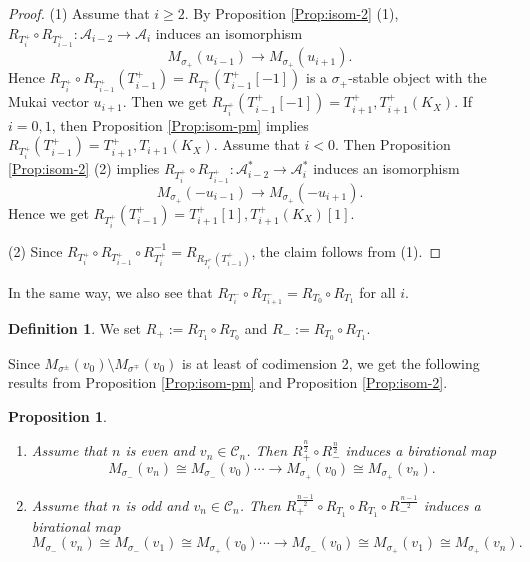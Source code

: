 \documentclass[leqno,11pt]{amsart}
\newtheorem{Prop}[Thm]{Proposition}
\theoremstyle{definition}
\newtheorem{Def}[Thm]{Definition}
\def\AA{\ensuremath{\mathcal A}}
\def\CC{\ensuremath{\mathcal C}}
\begin{document}
\begin{proof}
(1)
Assume that $i \geq 2$.
By Proposition \ref{Prop:isom-2} (1),
$R_{T_{i}^+}\circ R_{T_{i-1}^+}:\AA_{i-2} \to \AA_{i}$
induces an isomorphism
$$
M_{\sigma_+}(u_{i-1}) \to M_{\sigma_+}(u_{i+1}).
$$
Hence $R_{T_{i}^+}\circ R_{T_{i-1}^+}(T_{i-1}^+)
=R_{T_{i}^+}(T_{i-1}^+[-1])$
is a $\sigma_+$-stable object with the Mukai vector $u_{i+1}$.
Then we get 
$R_{T_{i}^+}(T_{i-1}^+[-1])=T_{i+1}^+,T_{i+1}^+(K_X)$.
If $i=0,1$, then Proposition \ref{Prop:isom-pm}
implies $R_{T_i^+}(T_{i-1}^+)=T_{i+1}^+,T_{i+1}(K_X)$.
Assume that $i<0$.
Then Proposition \ref{Prop:isom-2} (2) implies
$R_{T_{i}^+}\circ R_{T_{i-1}^+}:\AA_{i-2}^* \to \AA_{i}^*$
induces an isomorphism
$$
M_{\sigma_+}(-u_{i-1}) \to M_{\sigma_+}(-u_{i+1}).
$$
Hence we get 
$R_{T_{i}^+}(T_{i-1}^+)=T_{i+1}^+[1],T_{i+1}^+(K_X)[1]$.




(2)
Since $R_{T_i^+} \circ R_{T_{i-1}^+} \circ R_{T_i^+}^{-1}=
R_{R_{T_i^+}(T_{i-1}^+)}$, the claim follows from (1).
\end{proof}


In the same way, we also see that
 $R_{T_i^-} \circ R_{T_{i+1}^-} =R_{T_0} \circ R_{T_1}$ for all $i$.

\begin{Def}
We set $R_+:=R_{T_1} \circ R_{T_0}$ and
$R_-:=R_{T_0} \circ R_{T_1}$.
\end{Def}




Since $M_{\sigma^\pm}(v_0) \setminus M_{\sigma^\mp}(v_0)$
is at least of codimension 2,
we get the following results from Proposition \ref{Prop:isom-pm} and
Proposition \ref{Prop:isom-2}.


\begin{Prop}\label{Prop:NonMinimalIsomorphism}
\begin{enumerate}
\item[(1)]
Assume that $n$ is even and $v_n \in \CC_n$.
Then $R_+^{\frac{n}{2}} \circ R_-^{\frac{n}{2}}$ induces a birational map
\begin{equation}
M_{\sigma_-}(v_n) \cong M_{\sigma_-}(v_0) \cdots \to M_{\sigma_+}(v_0)
\cong M_{\sigma_+}(v_n).
\end{equation}
\item[(2)]
Assume that $n$ is odd and $v_n \in \CC_n$.
Then $R_+^{\frac{n-1}{2}} \circ R_{T_1} \circ R_{T_1} \circ R_-^{\frac{n-1}{2}}$
induces a birational map
\begin{equation}
M_{\sigma_-}(v_n) \cong M_{\sigma_-}(v_1) \cong M_{\sigma_+}(v_0) 
\cdots \to M_{\sigma_-}(v_0) \cong M_{\sigma_+}(v_1)
\cong M_{\sigma_+}(v_n).
\end{equation}
\end{enumerate}
\end{Prop}
\end{document}
